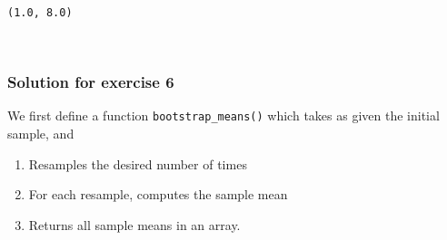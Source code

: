 \documentclass{scrartcl}
\makeatletter
\providecommand{\tightlist}{%
      \setlength{\itemsep}{0pt}\setlength{\parskip}{0pt}}
\newcommand{\boxspacing}{\kern\kvtcb@left@rule\kern\kvtcb@boxsep}
\newcommand{\prompt}[4]{
        {\ttfamily\llap{{\color{#2}[#3]:\hspace{3pt}#4}}\vspace{-\baselineskip}}
    }
\makeatother
\begin{document}
            \begin{tcolorbox}[breakable, size=fbox, boxrule=.5pt, pad at break*=1mm, opacityfill=0]
\prompt{Out}{outcolor}{29}{\boxspacing}
\begin{Verbatim}[commandchars=\\\{\}]
(1.0, 8.0)
\end{Verbatim}
\end{tcolorbox}
        
    \begin{center}
    \end{center}
    { \hspace*{\fill} \\}
    
    \hypertarget{solution-for-exercise-6}{%
\subsubsection{Solution for exercise 6}\label{solution-for-exercise-6}}

We first define a function \texttt{bootstrap\_means()} which takes as
given the initial sample, and

\begin{enumerate}
\def\labelenumi{\arabic{enumi}.}
\tightlist
\item
  Resamples the desired number of times
\item
  For each resample, computes the sample mean
\item
  Returns all sample means in an array.
\end{enumerate}
\end{document}
